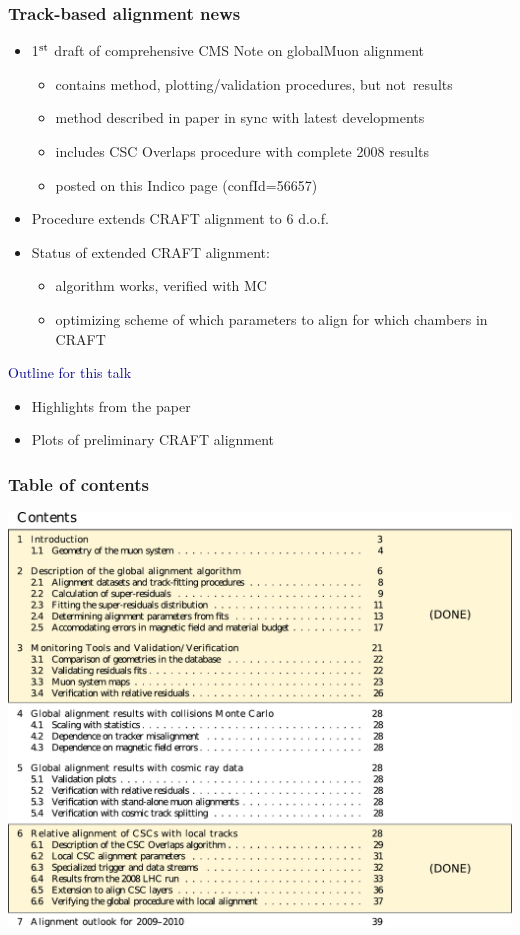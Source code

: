 \documentclass[compress]{beamer}
\begin{document}
\begin{frame}
\frametitle{Track-based alignment news}
\begin{itemize}\setlength{\itemsep}{0.25 cm}
\item 1$^{\mbox{\scriptsize st}}$ draft of comprehensive CMS Note on globalMuon alignment
\begin{itemize}\setlength{\itemsep}{0.1 cm}
\item contains method, plotting/validation procedures, but \mbox{not results\hspace{-1 cm}}
\item method described in paper in sync with latest developments
\item includes CSC Overlaps procedure with complete 2008 results
\item posted on this Indico page (confId=56657)
\end{itemize}
\item Procedure extends CRAFT alignment to 6 d.o.f.
\item Status of extended CRAFT alignment:
\begin{itemize}\setlength{\itemsep}{0.25 cm}
\item algorithm works, verified with MC
\item optimizing scheme of which parameters to align for which chambers in CRAFT
\end{itemize}
\end{itemize}

\vfill
\hspace{-0.83 cm} \textcolor{darkblue}{\Large Outline for this talk}
\begin{itemize}
\item Highlights from the paper
\item Plots of preliminary CRAFT alignment
\end{itemize}
\end{frame}

\begin{frame}
\frametitle{Table of contents}
\includegraphics[width=0.9\linewidth]{contents.pdf}
\end{frame}
\end{document}
